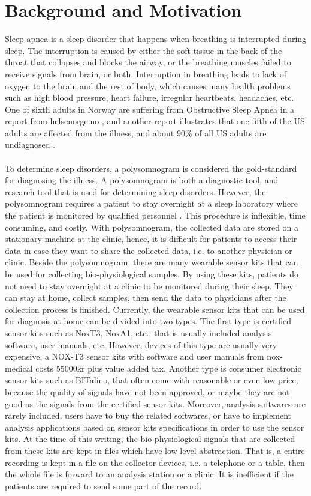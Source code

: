 \section{Background and Motivation}
Sleep apnea is a sleep disorder that happens when breathing is interrupted during sleep. The interruption is caused by either the soft tissue in the back of the throat that collapses and blocks the airway, or the breathing muscles failed to receive signals from brain, or both. Interruption in breathing leads to lack of oxygen to the brain and the rest of body, which causes many health problems such as high blood pressure, heart failure, irregular heartbeats, headaches, etc. One of sixth adults in Norway are suffering from Obstructive Sleep Apnea in a report from helsenorge.no \citep{HELSENORGES}, and another report illustrates that one fifth of the US adults are affected from the illness, and about 90\% of all US adults are undiagnosed \citep{SLEEP_M_UNDIAG}.\\\\
To determine sleep disorders, a polysomnogram is considered the gold-standard for diagnosing the illness. A polysomnogram is both a diagnostic tool, and research tool that is used for determining sleep disorders. However, the polysomnogram requires a patient to stay overnight at a sleep laboratory where the patient is monitored by qualified personnel \citep{NCBINLM}. This procedure is inflexible, time consuming, and costly. With polysomnogram, the collected data are stored on a stationary machine at the clinic, hence, it is difficult for patients to access their data in case they want to share the collected data, i.e. to another physician or clinic. Beside the polysomnogram, there are many wearable sensor kits that can be used for collecting bio-physiological samples. By using these kits, patients do not need to stay overnight at a clinic to be monitored during their sleep. They can stay at home, collect samples, then send the data to physicians after the collection process is finished. Currently, the wearable sensor kits that can be used for diagnosis at home can be divided into two types. The first type is certified sensor kits such as NoxT3, NoxA1, etc., that is usually included analysis software, user manuals, etc. However, devices of this type are usually very expensive, a NOX-T3 sensor kits with software and user manuals from nox-medical costs 55000kr plus value added tax\citep{Thomas}. Another type is consumer electronic sensor kits such as BITalino, that often come with reasonable or even low price, because the quality of signals have not been approved, or maybe they are not good as the signals from the certified sensor kits. Moreover, analysis softwares are rarely included, users have to buy the related softwares, or have to implement analysis applications based on sensor kits specifications in order to use the sensor kits. At the time of this writing, the bio-physiological signals that are collected from these kits are kept in files which have low level abstraction. That is, a entire recording is kept in a file on the collector devices, i.e. a telephone or a table, then the whole file is forward to an analysis station or a clinic. It is inefficient if the patients are required to send some part of the record.\\\\
